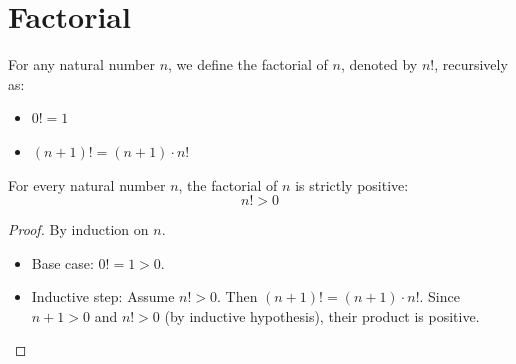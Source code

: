 \section{Factorial}

\begin{definition}[Factorial]
  \label{def:factorial}
  \leanok
  For any natural number $n$, we define the factorial of $n$, denoted by $n!$,
  recursively as:
  \begin{itemize}
    \item $0! = 1$
    \item $(n+1)! = (n+1) \cdot n!$
  \end{itemize}
\end{definition}

\begin{theorem}
  \label{thm:fac_pos}
  \leanok
  For every natural number $n$, the factorial of $n$ is strictly positive:
  \[ n! > 0 \]
\end{theorem}

\begin{proof}
  \leanok
  By induction on $n$.
  \begin{itemize}
    \item Base case: $0! = 1 > 0$.
    \item Inductive step: Assume $n! > 0$. Then $(n+1)! = (n+1) \cdot n!$.
      Since $n+1 > 0$ and $n! > 0$ (by inductive hypothesis), their product is positive.
  \end{itemize}
\end{proof}
